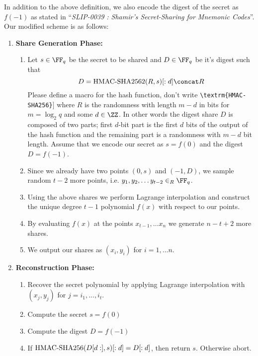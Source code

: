 \documentclass[envcountsame,runningheads,notitlepage]{llncs}
\DeclareRobustCommand{\michals}[2] {{\color{magenta}{$\big[$\scriptsize\textsf{Michal #1:}} #2$\big]$}}
\begin{document}
	In addition to the above definition, we also encode the digest of the secret as $f(-1)$ as stated in ``\textit{SLIP-0039 : Shamir's Secret-Sharing for Mnemonic Codes}''. Our modified scheme is as follows:
	\begin{enumerate}
		\item \textbf{Share Generation Phase:}  
		\begin{enumerate}
			\item Let $s \in \FF_q$ be the secret to be shared and $D \in \FF_q$ be it's digest such that 
			\begin{equation*}
			D = \hsha2(R,s)[:d] \concat R
			\end{equation*} 
			\michals{13.03}{Please define a macro for the hash function, don't write \texttt{\textbackslash textrm\{HMAC-SHA256\}}}
			where $R$ is the randomness with length $m - d$ in bits for $m = \log_{2}{q}$ and some $d \in \ZZ$. In other words the digest share $D$ is composed of two parts; first $d$-bit part is the first $d$ bits of the output of the hash function and the remaining part is a randomness with $m - d$ bit length. Assume that we encode our secret as $s = f(0)$ and the digest $D = f(-1)$.
			\item Since we already have two points $(0, s)$ and $(-1, D)$, we sample random $t-2$ more points, i.e. $y_{1}, y_{2}, \ldots y_{t-2} \in_{R} \FF_q$.
			\item Using the above shares we perform Lagrange interpolation and construct the unique degree $t - 1$ polynomial $f (x)$ with respect to our points.  
			\item By evaluating $f (x)$ at the points $x_{t - 1}, \ldots x_{n}$ we generate $n - t + 2$ more shares.
			\item We output our shares as $(x_{i},y_{i})$ for $i = 1, \ldots n$.
		\end{enumerate}
		\item \textbf{Reconstruction Phase:}  
		\begin{enumerate}
			\item Recover the secret polynomial by applying Lagrange interpolation with $(x_{j}, y_{j})$ for $j = i_{1}, \ldots, i_{t}$.
			\item Compute the secret $s = f(0)$
			\item Compute the digest $D = f(-1)$
			\item If ${\textrm{HMAC-SHA256}}(D[d:],s)[:d] = D[:d]$, then return $s$. Otherwise abort. 
		\end{enumerate}
	\end{enumerate}
	
\end{document}
